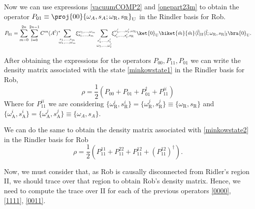 Now we can use expressions \eqref{vacuumCOMP2} and \eqref{onepart23m} to obtain the operator $P_{01}\equiv\proj{00}{\omega_A,s_A;\omega_\text{R},s_\text{R}}_\text{U}$ in the Rindler basis for Rob.
\begin{equation}\label{0011}
 P_{01}=\sum_{m=0}^{2n}\sum_{l=0}^{2n-1}C^m (A^{l})^*\!\!\!\sum_{\substack{s_1,\dots,s_m\\\omega_1,\dots,\omega_m}}\!\xi_{s_1,\dots,s_m}^{\omega_1,\dots,\omega_m}\sum_{\substack{s'_1,\dots,s'_{l}\\\omega_1,\dots,\omega'_{l}}}\!\xi_{s'_1,\dots,s'_l,s_\text{R}}^{\omega'_1,\dots,\omega'_l,\omega_\text{R}}\ket{0}_{\text{U}}\biket{\tilde m}{\tilde m}\langle{\tilde l}|_{\text{II}}\langle{\tilde l;\omega_\text{R},s_\text{R}}|_{\text{I}}\bra{0}_{\text{U}}.
\end{equation}

After obtaining the expressions for the operators $P_{00},P_{11},P_{01}$ we can write the density matrix associated with the state \eqref{minkowstate1} in the Rindler basis for Rob, 
\begin{equation}\label{roimp1}
\rho=\frac12\left(P_{00}+P_{01}+P_{01}^\dagger+P^{ii}_{11}\right)
\end{equation}
Where for $P_{11}^{ii}$ we are considering $\{\omega^i_\text{R},s^i_\text{R}\}=\{\omega^j_\text{R},s^j_\text{R}\}\equiv \{\omega_\text{R},s_\text{R}\}$ and $\{\omega^i_\text{A},s^i_\text{A}\}=\{\omega^j_\text{A},s^j_\text{A}\}\equiv \{\omega_A,s_A\}$.

We can do the same to obtain the density matrix associated with \eqref{minkowstate2} in the Rindler basis for Rob
\begin{equation}\label{roimp2}
\rho=\frac12\left(P^{11}_{11}+P^{22}_{11}+P^{12}_{11}+(P^{12}_{11})^\dagger\right).
\end{equation}

Now, we must consider that, as Rob is causally disconnected from Ridler's region II, we should trace over that region to obtain Rob's density matrix. Hence,  we need to compute the trace over II for each of the previous operators \eqref{0000}, \eqref{1111}, \eqref{0011}.

